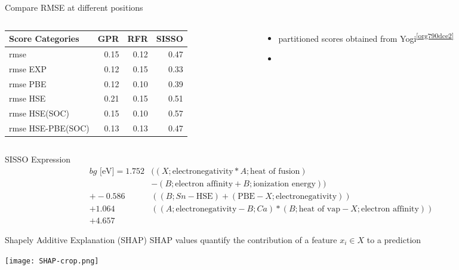 \documentclass[10pt, aspectratio=169, presentation]{beamer}
\begin{document}
\begin{frame}[label={sec:orgd4dac20}]{Compare RMSE at different positions}
\begin{columns}
\begin{column}{0.5\columnwidth}
\begin{center}
\begin{tabular}{lrrr}
Score Categories & GPR & RFR & SISSO\\[0pt]
\hline
rmse & 0.15 & 0.12 & 0.47\\[0pt]
rmse EXP & 0.12 & 0.15 & 0.33\\[0pt]
rmse PBE & 0.12 & 0.10 & 0.39\\[0pt]
rmse HSE & 0.21 & 0.15 & 0.51\\[0pt]
rmse HSE(SOC) & 0.15 & 0.10 & 0.57\\[0pt]
rmse HSE-PBE(SOC) & 0.13 & 0.13 & 0.47\\[0pt]
\end{tabular}
\end{center}
\end{column}

\begin{column}{0.5\columnwidth}
\begin{itemize}
\item partitioned scores obtained from Yogi\textsuperscript{\ref{org790dce2}}
\item 
\end{itemize}
\end{column}
\end{columns}
\end{frame}

\begin{frame}[label={sec:org39e97fb}]{SISSO Expression}
\begin{align*}
bg\mbox{ [eV]} = 1.752 &((X;\mbox{electronegativity}*A;\mbox{heat of fusion})\\
                       &-(B;\mbox{electron affinity}+B;\mbox{ionization energy}))\\
               +-0.586 &((B;Sn-\mbox{HSE})+(\mbox{PBE}-X;\mbox{electronegativity}))\\
                +1.064 &((A;\mbox{electronegativity}-B;Ca)*(B;\mbox{heat of vap}-X;\mbox{electron affinity}))\\
                +4.657
\end{align*}
\end{frame}

\begin{frame}[label={sec:org8e187cd}]{Shapely Additive Explanation (SHAP)}
SHAP values quantify the contribution of a feature \(x_i \in X\) to a prediction
\autocite{lundberg-2017-unified-approac}

\begin{center}
\texttt{[image: SHAP-crop.png]}
\end{center}
\end{frame}
\end{document}
